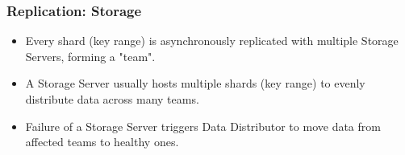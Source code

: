 

\begin{frame}
	\frametitle{Replication: Storage}
\begin{itemize}

      \item Every shard (key range) is asynchronously replicated with multiple Storage Servers, forming a "team".
      \item A Storage Server usually hosts multiple shards (key range) to evenly distribute data across many teams.
      \item Failure of a Storage Server triggers Data Distributor to move data from affected teams to healthy ones.

\end{itemize}
\end{frame}